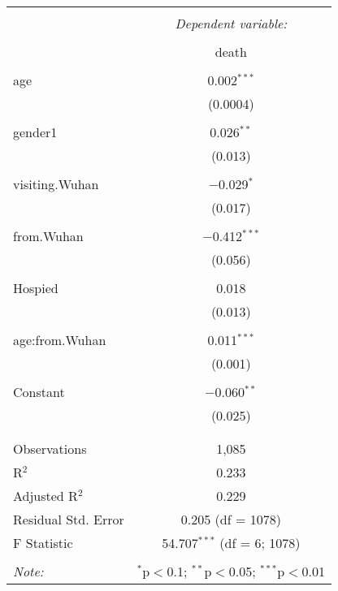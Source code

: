\documentclass[12pt,english]{article}
\begin{document}
\begin{table}[!htbp] \centering 
  \caption{} 
  \label{} 
\begin{tabular}{@{\extracolsep{5pt}}lc} 
\\[-1.8ex]\hline 
\hline \\[-1.8ex] 
 & \multicolumn{1}{c}{\textit{Dependent variable:}} \\ 
\cline{2-2} 
\\[-1.8ex] & death \\ 
\hline \\[-1.8ex] 
 age & 0.002$^{***}$ \\ 
  & (0.0004) \\ 
  & \\ 
 gender1 & 0.026$^{**}$ \\ 
  & (0.013) \\ 
  & \\ 
 visiting.Wuhan & $-$0.029$^{*}$ \\ 
  & (0.017) \\ 
  & \\ 
 from.Wuhan & $-$0.412$^{***}$ \\ 
  & (0.056) \\ 
  & \\ 
 Hospied & 0.018 \\ 
  & (0.013) \\ 
  & \\ 
 age:from.Wuhan & 0.011$^{***}$ \\ 
  & (0.001) \\ 
  & \\ 
 Constant & $-$0.060$^{**}$ \\ 
  & (0.025) \\ 
  & \\ 
  \hline \\[-1.8ex] 
Observations & 1,085 \\ 
R$^{2}$ & 0.233 \\ 
Adjusted R$^{2}$ & 0.229 \\ 
Residual Std. Error & 0.205 (df = 1078) \\ 
F Statistic & 54.707$^{***}$ (df = 6; 1078) \\ 
\hline 
\hline \\[-1.8ex] 
\textit{Note:}  & \multicolumn{1}{r}{$^{*}$p$<$0.1; $^{**}$p$<$0.05; $^{***}$p$<$0.01} \\ 
\end{tabular} 
\end{table}
\end{document}

